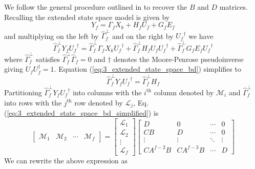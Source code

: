 We follow the general procedure outlined in \cite{trnka2007subspace} to recover the $B$ and $D$ matrices. Recalling the extended state space model is given by
\begin{equation*}
Y_f = \Gamma_f X_k + H_f U_f + G_f E_f
\end{equation*}
and multiplying on the left by $\hat{\Gamma}_f^\perp$ and on the right by ${U_f}^\dagger$ we have
\begin{equation}\label{eq:3_extended_state_space_bd}
\hat{\Gamma}_f^\perp Y_f {U_f}^\dagger = \hat{\Gamma}_f^\perp\Gamma_f X_k {U_f}^\dagger + \hat{\Gamma}_f^\perp H_f U_f {U_f}^\dagger + \hat{\Gamma}_f^\perp G_f E_f {U_f}^\dagger
\end{equation}
where $\hat{\Gamma}_f^\perp$ satisfies $\hat{\Gamma}_f^\perp\hat{\Gamma}_f = 0$ and $\dagger$ denotes the Moore-Penrose pseudoinverse giving $U_f U_f^\dagger = 1$. Equation (\ref{eq:3_extended_state_space_bd}) simplifies to
\begin{equation}\label{eq:3_extended_state_space_bd_simplified}
\hat{\Gamma}_f^\perp Y_f {U_f}^\dagger = \hat{\Gamma}_f^\perp H_f 
\end{equation}
Partitioning $\hat{\Gamma}_f^\perp Y_f {U_f}^\dagger$ into columns with the $i^{\mbox{th}}$ column denoted by $\mathcal{M}_i$ and $\hat{\Gamma}_f^\perp$ into rows with the $j^{\mbox{th}}$ row denoted by $\mathcal{L}_j$, Eq. (\ref{eq:3_extended_state_space_bd_simplified}) is
\begin{equation*}
\begin{bmatrix}\mathcal{M}_1 & \mathcal{M}_2 & \cdots & \mathcal{M}_f\end{bmatrix} = 
\begin{bmatrix}\mathcal{L}_1\\ \mathcal{L}_2\\ \vdots\\ \mathcal{L}_f\end{bmatrix}
\begin{bmatrix}
D & 0 & \cdots & 0\\
CB & D & \cdots & 0\\
\vdots & \vdots  & \ddots & \vdots\\
CA^{f-2}B & CA^{f-3}B & \cdots & D
\end{bmatrix}
\end{equation*}
We can rewrite the above expression as
